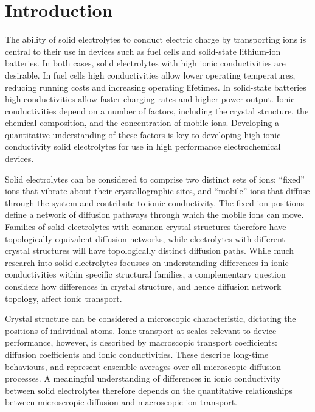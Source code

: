 \documentclass[aps,prb,twocolumn,superscriptaddress,reprint]{revtex4-1}
\begin{document}
\maketitle

\section{Introduction}

The ability of solid electrolytes to conduct electric charge by transporting  ions is central to their use in devices such as fuel cells and solid-state lithium-ion batteries.\cite{BachmanEtAl_ChemRev2016, ManthiramEtAl_NatRevMater2017,GoodenoughAndSingh_JElectrochemSoc2015, MalavasiEtAl_ChemSocRev2010} In both cases, solid electrolytes with high ionic conductivities are desirable. In fuel cells high conductivities allow lower operating temperatures, reducing running costs and increasing operating lifetimes. In solid-state batteries high conductivities allow faster charging rates and higher power output. Ionic conductivities depend on a number of factors, including the crystal structure, the chemical composition, and the concentration of mobile ions.\cite{VanDerVenEtAl_AccChemRes2013} Developing a quantitative understanding of these factors is key to developing high ionic conductivity solid electrolytes for use in high performance electrochemical devices.

Solid electrolytes can be considered to comprise two distinct sets of ions: ``fixed'' ions that vibrate about their crystallographic sites, and ``mobile'' ions that diffuse through the system and contribute to ionic conductivity. The fixed ion positions define a network of diffusion pathways through which the mobile ions can move. Families of solid electrolytes with common crystal structures therefore have topologically equivalent diffusion networks, while electrolytes with different crystal structures will have topologically distinct diffusion paths. While much research into solid electrolytes focusses on understanding differences in ionic conductivities within specific structural families, a complementary question considers how differences in crystal structure, and hence diffusion network topology, affect ionic transport.

Crystal structure can be considered a microscopic characteristic, dictating the positions of individual atoms. Ionic transport at scales relevant to device performance, however, is described by macroscopic transport coefficients: diffusion coefficients and ionic conductivities. These describe long-time behaviours, and represent ensemble averages over all microscopic diffusion processes. A meaningful understanding of differences in ionic conductivity between solid electrolytes therefore depends on the quantitative relationships between microscropic diffusion and macroscopic ion transport.
\end{document}
